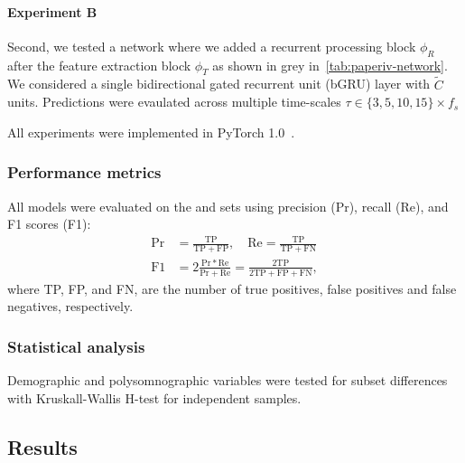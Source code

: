 \paragraph{Experiment B} Second, we tested a network where we added a recurrent processing block $\phi_{R}$ after the feature extraction block $\phi_{T}$ as shown in grey in~\cref{tab:paperiv-network}. We considered a single bidirectional gated recurrent unit (bGRU) layer with $\tilde{C}$ units. Predictions were evaulated across multiple time-scales $\tau \in \lbrace 3, 5, 10, 15 \rbrace \times f_{s}$ 

All experiments were implemented in PyTorch 1.0~\cite{Paszke2019a}.

\subsubsection{Performance metrics}
All models were evaluated on the \eval{} and \test{} sets using precision (Pr), recall (Re), and F1 scores (F1):
\begin{align*}
    \mathrm{Pr} &= \frac{\mathrm{TP}}{\mathrm{TP} + \mathrm{FP}}, \quad \mathrm{Re} = \frac{\mathrm{TP}}{\mathrm{TP} + \mathrm{FN}} \\
    \mathrm{F1} &= 2 \frac{\mathrm{Pr} * \mathrm{Re}}{\mathrm{Pr} + \mathrm{Re}} = \frac{2\mathrm{TP}}{2\mathrm{TP} + \mathrm{FP} + \mathrm{FN}},
\end{align*}
where TP, FP, and FN, are the number of true positives, false positives and false negatives, respectively.

\subsubsection{Statistical analysis}
Demographic and polysomnographic variables were tested for subset differences with Kruskall-Wallis H-test for independent samples.

\subsection{Results}

